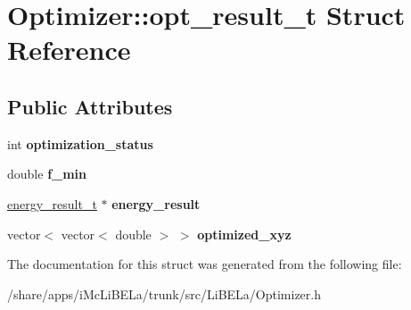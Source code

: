 \hypertarget{structOptimizer_1_1opt__result__t}{
\section{Optimizer::opt\_\-result\_\-t Struct Reference}
\label{structOptimizer_1_1opt__result__t}
}
\subsection*{Public Attributes}
\begin{DoxyCompactItemize}
\item 
\hypertarget{structOptimizer_1_1opt__result__t_a6912d041ddc6fa650c476638ee1bb883}{
int {\bfseries optimization\_\-status}}
\label{structOptimizer_1_1opt__result__t_a6912d041ddc6fa650c476638ee1bb883}

\item 
\hypertarget{structOptimizer_1_1opt__result__t_aa5433a985c2685f8c075d88d0a889966}{
double {\bfseries f\_\-min}}
\label{structOptimizer_1_1opt__result__t_aa5433a985c2685f8c075d88d0a889966}

\item 
\hypertarget{structOptimizer_1_1opt__result__t_af87a0ccc9e6b39e35471a3b8c592f099}{
\hyperlink{structenergy__result__t}{energy\_\-result\_\-t} $\ast$ {\bfseries energy\_\-result}}
\label{structOptimizer_1_1opt__result__t_af87a0ccc9e6b39e35471a3b8c592f099}

\item 
\hypertarget{structOptimizer_1_1opt__result__t_ab62c132173fc59d06b12adc638e424bb}{
vector$<$ vector$<$ double $>$ $>$ {\bfseries optimized\_\-xyz}}
\label{structOptimizer_1_1opt__result__t_ab62c132173fc59d06b12adc638e424bb}

\end{DoxyCompactItemize}


The documentation for this struct was generated from the following file:\begin{DoxyCompactItemize}
\item 
/share/apps/iMcLiBELa/trunk/src/LiBELa/Optimizer.h\end{DoxyCompactItemize}
